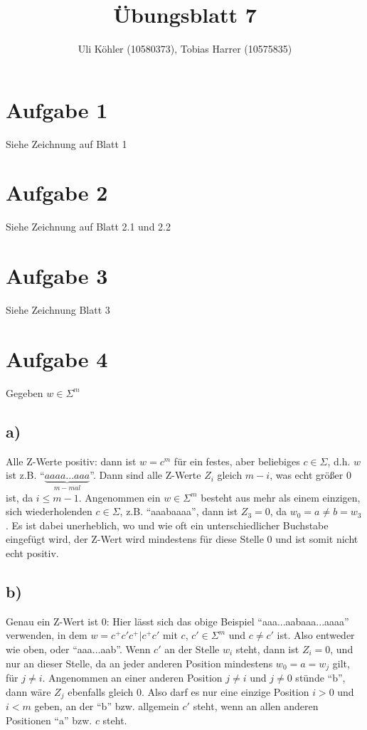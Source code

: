 \documentclass[a4paper,10pt,oneside,leqno]{scrartcl}
\title{Übungsblatt 7}
\author{Uli Köhler (10580373), Tobias Harrer (10575835)}
\begin{document}
\maketitle
\section*{Aufgabe 1}
Siehe Zeichnung auf Blatt 1
\section*{Aufgabe 2}
Siehe Zeichnung auf Blatt 2.1 und 2.2
\section*{Aufgabe 3}
Siehe Zeichnung Blatt 3
\section*{Aufgabe 4}
Gegeben $w \in \Sigma^m$
  \subsection*{a)}
  Alle Z-Werte positiv: dann ist $w = c^m$ für ein festes, aber beliebiges $c \in \Sigma$, d.h. $w$ ist z.B. ``$\underbrace{aaaa...aaa
  }_{m-mal}$''. Dann sind alle Z-Werte $Z_i$ gleich $m-i$, was echt größer 0 ist, da $i \leq m-1$. Angenommen ein $w \in \Sigma^m$ besteht
  aus mehr als einem einzigen, sich wiederholenden $c \in \Sigma$, z.B. ``aaabaaaa'', dann ist $Z_3=0$, da $w_0 = a \neq  b=w_3$. Es ist
  dabei unerheblich, wo und wie oft ein unterschiedlicher Buchstabe eingefügt wird, der Z-Wert wird mindestens für diese Stelle 0 und ist
  somit nicht echt positiv.
  \subsection*{b)}
  Genau ein Z-Wert ist 0: Hier lässt sich das obige Beispiel ``aaa...aabaaa...aaaa'' verwenden, in dem $w = c^+c'c^+ | c^+c'$ mit
  $c$, $c' \in \Sigma^m$ und $c \neq c'$ ist. Also entweder wie oben, oder ``aaa...aab''. Wenn $c'$ an der Stelle
  $w_i$ steht, dann ist $Z_i=0$, und nur an dieser Stelle, da an jeder anderen Position mindestens $w_0 = a = w_j$ gilt, für $j \neq i$.
  Angenommen an einer anderen Position $j \neq i$ und $j \neq 0$ stünde ``b'', dann wäre $Z_j$ ebenfalls gleich 0. Also darf es nur eine
  einzige Position $i>0$ und $i<m$ geben, an der ``b'' bzw. allgemein $c'$ steht, wenn an allen anderen Positionen ``a'' bzw. $c$ steht.
\end{document}
